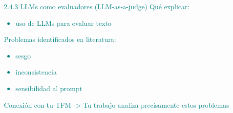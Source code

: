 \textcolor{teal}{
    2.4.3 LLMs como evaluadores (LLM-as-a-judge)
    Qué explicar:
    \begin{itemize}
        \item uso de LLMs para evaluar texto
    \end{itemize}
    Problemas identificados en literatura:
    \begin{itemize}
        \item sesgo
        \item inconsistencia
        \item sensibilidad al prompt
    \end{itemize}
    Conexión con tu TFM -> Tu trabajo analiza precisamente estos problemas
}